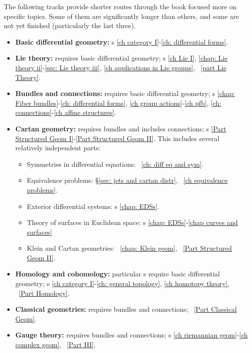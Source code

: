 The following tracks provide shorter routes through the book focused more on specific topics. Some of them are significantly longer than others, and some are not yet finished (particularly the last three).

\begin{itemize}
    \item \textbf{Basic differential geometry:} \Chap s \ref{ch category I}-\ref{ch: differential forms}.
    \item \textbf{Lie theory:} requires basic differential geometry; \Chap s \ref{ch Lie I}, \ref{chap: Lie theory ii}-\ref{sec: Lie theory iii}, \ref{ch applications in Lie groups}, \Part~\ref{part Lie Theory}.
    \item \textbf{Bundles and connections:} requires basic differential geometry; \Chap s \ref{chap: Fiber bundles}-\ref{ch: differential forms}, \ref{ch group actions}-\ref{ch pfb}, \ref{ch: connections}-\ref{ch affine structures}.
    \item \textbf{Cartan geometry:} requires bundles and includes connections; \Part s \ref{Part Structured Geom I}-\ref{Part Structured Geom II}. This includes several relatively independent parts:
        \begin{itemize}
            \item Symmetries in differential equations: \Chap~\ref{ch: diff eq and sym}.
            \item Equivalence problems: \S\ref{sec: jets and cartan distr}, \Chap~\ref{ch equivalence problems}.
            \item Exterior differential systems: \Chap s \ref{chap: EDSs}.
            \item Theory of surfaces in Euclidean space: \Chap s \ref{chap: EDSs}-\ref{chap curves and surfaces}
            \item Klein and Cartan geometries: \Chap~\ref{chap: Klein geom}, \Part~\ref{Part Structured Geom II}.
        \end{itemize}
    \item \textbf{Homology and cohomology:} particular \chap s require basic differential geometry; \Chap s \ref{ch category I}-\ref{ch: general topology}, \ref{ch homotopy theory}, \Part~\ref{Part Homology}.
    \item \textbf{Classical geometries:} requires bundles and connections; \Part~\ref{Part Classical Geom}.
    \item \textbf{Gauge theory:} requires bundles and connections; \Chap s \ref{ch riemannian geom}-\ref{ch complex geom}, \Part~\ref{Part III}.
\end{itemize}